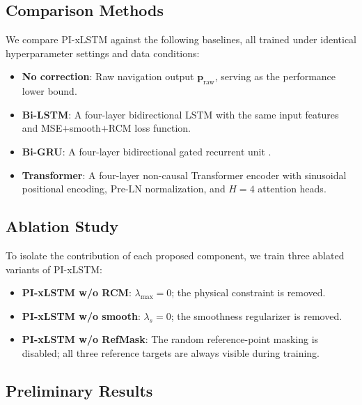 \documentclass[conference]{IEEEtran}
\newcommand{\vp}{\mathbf{p}}
\begin{document}
\subsection{Comparison Methods}

We compare PI-xLSTM against the following baselines,
all trained under identical hyperparameter settings and data conditions:
\begin{itemize}
  \item \textbf{No correction}: Raw navigation output $\vp_\text{raw}$, serving
        as the performance lower bound.
  \item \textbf{Bi-LSTM}: A four-layer bidirectional LSTM \cite{hochreiter1997lstm}
        with the same input features and MSE$+$smooth$+$RCM loss function.
  \item \textbf{Bi-GRU}: A four-layer bidirectional gated recurrent unit \cite{cho2014gru}.
  \item \textbf{Transformer}: A four-layer non-causal Transformer encoder with
        sinusoidal positional encoding, Pre-LN normalization, and
        $H{=}4$ attention heads.
\end{itemize}

\subsection{Ablation Study}

To isolate the contribution of each proposed component, we train three ablated
variants of PI-xLSTM:
\begin{itemize}
  \item \textbf{PI-xLSTM w/o RCM}: $\lambda_\text{max}{=}0$; the physical constraint
        is removed.
  \item \textbf{PI-xLSTM w/o smooth}: $\lambda_s{=}0$; the smoothness regularizer
        is removed.
  \item \textbf{PI-xLSTM w/o RefMask}: The random reference-point masking is
        disabled; all three reference targets are always visible during training.
\end{itemize}

\subsection{Preliminary Results}
\end{document}
